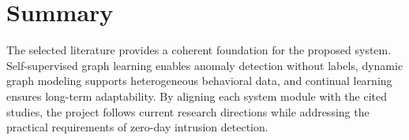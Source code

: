 \section{Summary}
The selected literature provides a coherent foundation for the proposed system.
Self-supervised graph learning enables anomaly detection without labels, dynamic
graph modeling supports heterogeneous behavioral data, and continual learning
ensures long-term adaptability. By aligning each system module with the cited
studies, the project follows current research directions while addressing the
practical requirements of zero-day intrusion detection.
